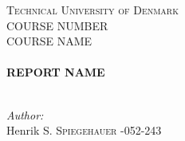 \begin{titlepage}
\fontsize{10pt}{10pt}
\selectfont
\center %


\textsc{\LARGE Technical University of Denmark}\\[1.3cm] %
\textsc{\large COURSE NUMBER }\\[0.5cm] %
\textsc{\large COURSE NAME }\\[0.5cm] %


\HRule \\[0.6cm]
{ \large \bfseries\LARGE
REPORT NAME
} \\[0.8cm]  %
\HRule \\ [2cm]
 
\begin{minipage}{0.6\textwidth}
\begin{flushleft} \large
\emph{Author:}\\
 Henrik \textsc{S. Spiegehauer} \tab{}-052-243\\
\end{flushleft}
\end{minipage}





\end{titlepage}
